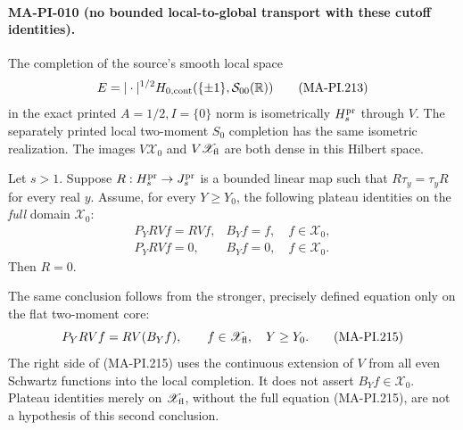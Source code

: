 \paragraph{MA-PI-010 (no bounded local-to-global transport with these cutoff identities).}
The completion of the source's smooth local space
\[
 E=|\cdot|^{1/2}H_{0,\rm cont}
                (\{\pm1\},\mathcal S_{00}(\mathbb R))
 \tag{MA-PI.213}
\]
in the exact printed \(A=1/2,I=\{0\}\) norm is isometrically
\(H_s^{\rm pr}\) through \(V\).  The separately printed local
two-moment \(S_0\) completion has the same isometric realization.
The images \(V\mathscr X_0\) and \(V\mathscr X_{\rm fl}\) are
both dense in this Hilbert space.

Let \(s>1\).  Suppose
\(R:H_s^{\rm pr}\to J_s^{\rm pr}\) is a bounded linear map
such that \(R\tau_y=\tau_yR\) for every real \(y\).
Assume, for every \(Y\ge Y_0\), the following plateau
identities on the \emph{full} domain \(\mathscr X_0\):
\[
 \begin{array}{ll}
 P_YRVf=RVf,& B_Yf=f,\quad f\in\mathscr X_0,\\
 P_YRVf=0,& B_Yf=0,\quad f\in\mathscr X_0.
 \end{array}
 \tag{MA-PI.214}
\]
Then \(R=0\).

The same conclusion follows from the stronger, precisely
defined equation only on the flat two-moment core:
\[
       P_YRVf=RV(B_Yf),
       \qquad f\in\mathscr X_{\rm fl},\quad Y\ge Y_0.
 \tag{MA-PI.215}
\]
The right side of (MA-PI.215) uses the continuous extension
of \(V\) from all even Schwartz functions into the local
completion.  It does not assert \(B_Yf\in\mathscr X_0\).
Plateau identities merely on \(\mathscr X_{\rm fl}\), without
the full equation (MA-PI.215), are not a hypothesis of this
second conclusion.

